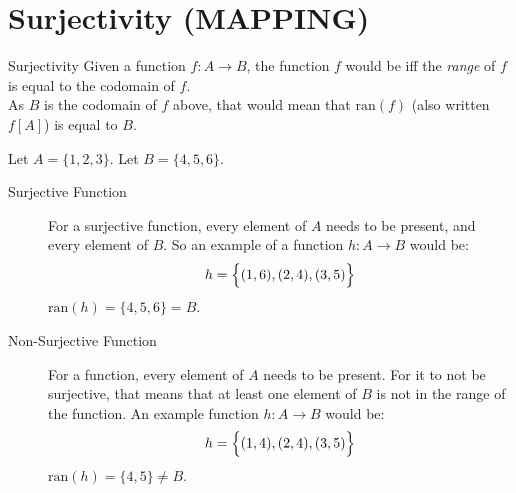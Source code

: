 \documentclass[\main/notes.tex]{subfiles}
\begin{document}
		\section[Surjectivity]{Surjectivity (MAPPING)}
			\begin{definition}{Surjectivity}
				Given a function $f: A \rightarrow B$, the function $f$ would be  iff the \emph{range} of $f$ is equal to the codomain of $f$.\\
				As $B$ is the codomain of $f$ above, that would mean that $\mathrm{ran}(f)$ (also written $f[A]$) is equal to $B$.
			\end{definition}
			\begin{example}
				Let $A = \{1, 2, 3\}$. Let $B = \{4, 5, 6\}$.
				\begin{description}
					\item[Surjective Function] For a surjective function, every element of $A$ needs to be present, and every element of $B$. So an example of a function $h: A \rightarrow B$ would be:
						\begin{align*}
							h = \Bigl\{(1, 6), (2, 4), (3, 5)\Bigr\}
						\end{align*}
						$\mathrm{ran}(h) = \{4, 5, 6\} = B$.
					\item[Non-Surjective Function] For a function, every element of $A$ needs to be present. For it to not be surjective, that means that at least one element of $B$ is not in the range of the function. An example function $h: A \rightarrow B$ would be:
						\begin{align*}
							h = \Bigl\{(1, 4), (2, 4), (3, 5)\Bigr\}
						\end{align*}
						$\mathrm{ran}(h) = \{4, 5\} \neq B$.
				\end{description}
			\end{example}
\end{document}
